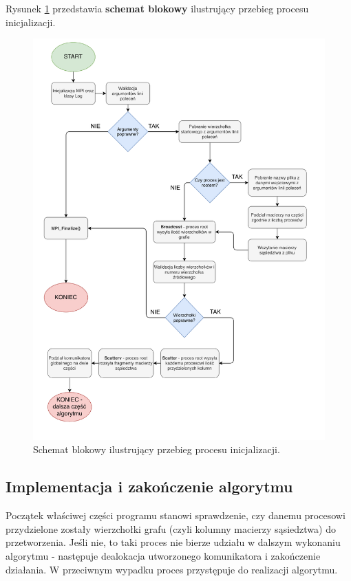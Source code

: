 \documentclass[12pt]{article}
\begin{document}
Rysunek \ref{fig:diagram1} przedstawia \textbf{schemat blokowy} ilustrujący przebieg procesu inicjalizacji.

\begin{figure}[H]
\centering
\includegraphics[width=\textwidth]{static/Diagram1.pdf}
\caption{Schemat blokowy ilustrujący przebieg procesu inicjalizacji.}
\label{fig:diagram1}
\end{figure}


\subsection{Implementacja i zakończenie algorytmu}
Początek właściwej części programu stanowi sprawdzenie, czy danemu procesowi przydzielone zostały wierzchołki grafu (czyli kolumny macierzy sąsiedztwa) do przetworzenia. Jeśli nie, to taki proces nie bierze udziału w dalszym wykonaniu algorytmu - następuje dealokacja utworzonego komunikatora i zakończenie działania. W przeciwnym wypadku proces przystępuje do realizacji algorytmu. 
\end{document}
